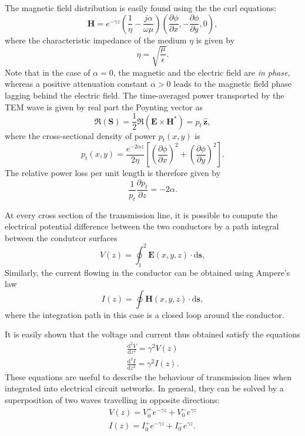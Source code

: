 The magnetic field distribution
is easily found using the the curl equations:
\begin{equation}
		\mathbf{H}=e^{-\gamma z} \left(\frac{1}{\eta}-\frac{j\alpha}{\omega\mu} \right)\left(\frac{\partial\phi}{\partial x}, -\frac{\partial\phi}{\partial y},0\right),
\end{equation}
where the characteristic impedance of the medium $\eta$ is given by
\begin{equation}
	\eta=\sqrt{\frac{\mu}{\epsilon}}.
\end{equation}
Note that in the case of $\alpha=0$, the magnetic and the electric field are \textit{in phase},
whereas a positive attenuation constant $\alpha>0$ leads to the magnetic field phase lagging behind the electric field.
%
The time-averaged power transported by the TEM wave is given by real part the 
Poynting vector as
\begin{equation}
	\Re(\mathbf{S})=\frac{1}{2}\Re(\mathbf{E}\times\mathbf{H}^\ast) = p_t\,\hat{\mathbf{z}},
\end{equation}
where the cross-sectional density of power $p_t(x,y)$ is
\begin{equation}
	p_t(x,y)=\frac{e^{-2\alpha z}}{2\eta} \left[\left(\frac{\partial\phi}{\partial x}\right)^2+\left(\frac{\partial\phi}{\partial y}\right)^2\right].
\end{equation}
The relative power loss per unit length is therefore given by
\begin{equation}
	 \frac{1}{p_t}\frac{\partial p_t}{\partial z} = -2\alpha.
\end{equation}

At every cross section of
the transmission line, it is possible to compute the electrical
potential difference between the two conductors by a path integral 
between the condutcor surfaces
%
\begin{equation}
V(z) = \oint_1^2 \mathbf{E}(x,y,z)\cdot \mathrm{d}\mathbf{s},
\end{equation}
%
Similarly, the current flowing in the conductor can be obtained using
Ampere's law
%
\begin{equation}
I(z) = \oint \mathbf{H}(x,y,z)\cdot \mathrm{d}\mathbf{s},
\end{equation}
%
where the integration path in this case is a closed loop around the
conductor. 


It is easily shown that the voltage and current thus obtained
satisfy the equations
%
\begin{eqnarray}
\frac{\mathrm{d}^2 V}{\mathrm{d}z^2} = \gamma^2 V(z) \\
\frac{\mathrm{d}^2 I}{\mathrm{d}z^2} = \gamma^2 I(z).
\end{eqnarray}
%
These equations are useful to describe the behaviour of transmission
lines when integrated into electrical circuit networks. In general, they
can be solved by a superposition of two waves travelling in opposite
directions:
%
\begin{eqnarray}
V(z) = V_0^+ e^{-\gamma z} + V_0^- e^{\gamma z} \\ 
I(z) = I_0^+ e^{-\gamma z} + I_0^- e^{\gamma z}.
\end{eqnarray}

